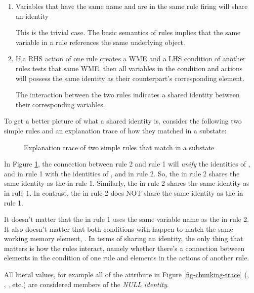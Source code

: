 \begin{enumerate}
	\item Variables that have the same name and are in the same rule firing will share an identity

	This is the trivial case.  The basic semantics of rules implies that the same variable in a rule references the same underlying object.

	\vspace{-6pt}
	\item If a RHS action of one rule creates a WME and a LHS condition of another rules tests that same WME, then all variables in the condition and actions will possess the same identity as their counterpart's corresponding element. 

	The interaction between the two rules indicates a shared identity between their corresponding variables.
	\vspace{-6pt}
\end{enumerate}

To get a better picture of what a shared identity is, consider the following two simple rules and an explanation trace of how they matched in a substate:

\begin{figure}
	\caption{Explanation trace of two simple rules that match in a substate}
	\label{fig:chunking-trace2}
\end{figure}

In Figure \ref{fig:chunking-trace2}, the connection between rule 2 and rule 1 will \textit{unify} the identities of ,  and  in rule 1 with the identities of ,  and  in rule 2.  So, the  in rule 2 shares the same identity as the  in rule 1.  Similarly, the  in rule 2 shares the same identity as  in rule 1.  In contrast, the  in rule 2 does NOT share the same identity as the  in rule 1. 

It doesn't matter that the  in rule 1 uses the same variable name as the  in rule 2.  It also doesn't matter that both conditions with  happen to match the same working memory element, .  In terms of sharing an identity, the only thing that matters is how the rules interact, namely whether there's a connection between elements in the condition of one rule and elements in the actions of another rule.

All literal values, for example all of the attribute in Figure \ref{fig-chunking-trace} (, , , etc.) are considered members of the \textit{NULL identity}.

